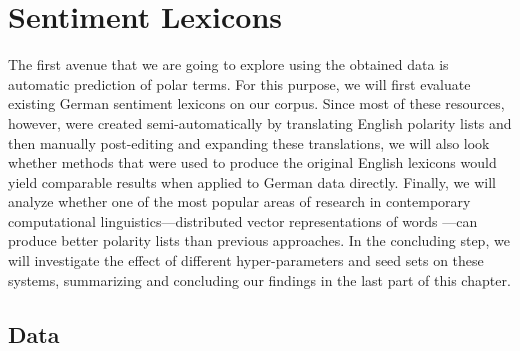 

\chapter{Sentiment Lexicons}\label{chap:snt:lex}

The first avenue that we are going to explore using the obtained data
is automatic prediction of polar terms.
For this purpose, we will first evaluate existing German sentiment
lexicons on our corpus.  Since most of these resources, however, were
created semi-automatically by translating English polarity lists and
then manually post-editing and expanding these translations, we will
also look whether methods that were used to produce the original
English lexicons would yield comparable results when applied to German
data directly.  Finally, we will analyze whether one of the most
popular areas of research in contemporary computational
linguistics---distributed vector representations of words
\cite{Mikolov:13}---can produce better polarity lists than previous
approaches.  In the concluding step, we will investigate the effect of
different hyper-parameters and seed sets on these systems, summarizing
and concluding our findings in the last part of this chapter.

\section{Data}\label{sec:snt-lex:data}

